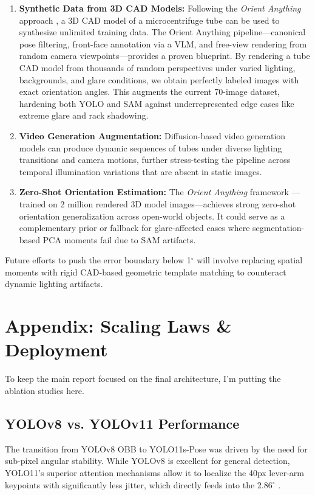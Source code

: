 \documentclass[11pt,a4paper]{article}
\begin{document}
   \begin{enumerate}
       \item \textbf{Synthetic Data from 3D CAD Models:} Following the \textit{Orient Anything}
 approach \cite{orient_anything}, a 3D CAD model of a microcentrifuge tube can be used to
 synthesize unlimited training data. The Orient Anything pipeline---canonical pose filtering,
 front-face annotation via a VLM, and free-view rendering from random camera viewpoints---provides
 a proven blueprint. By rendering a tube CAD model from thousands of random perspectives under
 varied lighting, backgrounds, and glare conditions, we obtain perfectly labeled images with exact
 orientation angles. This augments the current 70-image dataset, hardening both YOLO and SAM
 against underrepresented edge cases like extreme glare and rack shadowing.

       \item \textbf{Video Generation Augmentation:} Diffusion-based video generation models can
 produce dynamic sequences of tubes under diverse lighting transitions and camera motions, further
 stress-testing the pipeline across temporal illumination variations that are absent in static
 images.

       \item \textbf{Zero-Shot Orientation Estimation:} The \textit{Orient Anything} framework
 \cite{orient_anything}---trained on 2 million rendered 3D model images---achieves strong zero-shot
 orientation generalization across open-world objects. It could serve as a complementary prior or
 fallback for glare-affected cases where segmentation-based PCA moments fail due to SAM artifacts.
   \end{enumerate}

   Future efforts to push the error boundary below 1$^\circ$ will involve replacing spatial moments
 with rigid CAD-based geometric template matching to counteract dynamic lighting artifacts.


\appendix
\section{Appendix: Scaling Laws & Deployment}
To keep the main report focused on the final architecture, I'm putting the ablation studies here.

\subsection{YOLOv8 vs. YOLOv11 Performance}
The transition from YOLOv8 OBB to YOLO11s-Pose was driven by the need for sub-pixel angular stability. While YOLOv8 is excellent for general detection, YOLO11's superior attention mechanisms allow it to localize the 40px lever-arm keypoints with significantly less jitter, which directly feeds into the 2.86$^\circ$ .
\end{document}
